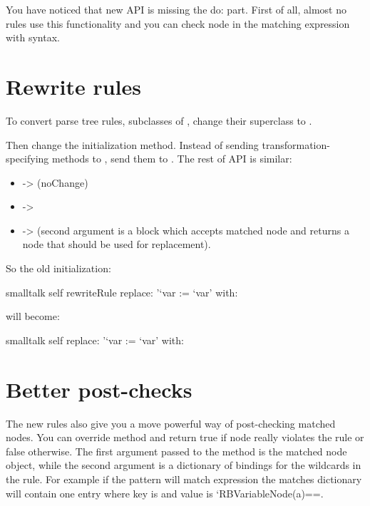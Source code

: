 \documentclass[10pt,twoside,english]{_support/latex/sbabook/sbabook}
\begin{document}
You have noticed that new API is missing the do: part. First of all, almost no rules use this functionality and you can check node in the matching expression with  syntax.

\section{Rewrite rules}
To convert parse tree rules, subclasses of , change their superclass to .

Then change the initialization method. Instead of sending transformation-specifying methods to , send them to . The rest of API is similar:

\begin{itemize}
    \item {} -\textgreater{}  (noChange)
    \item {} -\textgreater{} 
    \item {} -\textgreater{}  (second argument is a block which accepts matched node and returns a node that should be used for replacement).
\end{itemize}

So the old initialization:
\begin{displaycode}{smalltalk}
self rewriteRule
	replace: '`var := `var' with: 
\end{displaycode}

will become:
\begin{displaycode}{smalltalk}
self replace: '`var := `var' with: 
\end{displaycode}

\section{Better post-checks}
The new rules also give you a move powerful way of post-checking matched nodes. You can override  method and return true if node really violates the rule or false otherwise. The first argument passed to the method is the matched node object, while the second argument is a dictionary of bindings for the wildcards in the rule.
For example if the pattern  will match expression  the matches dictionary will contain one entry where key is  and value is `RBVariableNode(a)==.






\backmatter

\end{document}
